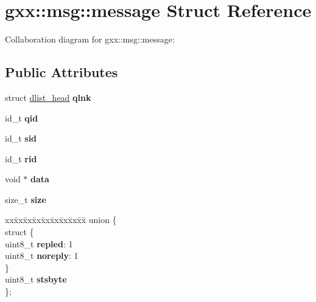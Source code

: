 \hypertarget{structgxx_1_1msg_1_1message}{}\section{gxx\+:\+:msg\+:\+:message Struct Reference}
\label{structgxx_1_1msg_1_1message}


Collaboration diagram for gxx\+:\+:msg\+:\+:message\+:
\subsection*{Public Attributes}
\begin{DoxyCompactItemize}
\item 
struct \hyperlink{structdlist__head}{dlist\+\_\+head} {\bfseries qlnk}\hypertarget{structgxx_1_1msg_1_1message_aab131dd5ad50013aaa9533d8c9e52fd8}{}\label{structgxx_1_1msg_1_1message_aab131dd5ad50013aaa9533d8c9e52fd8}

\item 
id\+\_\+t {\bfseries qid}\hypertarget{structgxx_1_1msg_1_1message_a4a767f9e00d74609cc0149b1c5ab6e15}{}\label{structgxx_1_1msg_1_1message_a4a767f9e00d74609cc0149b1c5ab6e15}

\item 
id\+\_\+t {\bfseries sid}\hypertarget{structgxx_1_1msg_1_1message_a891bfe1dd56d0a3872dc939ec88a7b7d}{}\label{structgxx_1_1msg_1_1message_a891bfe1dd56d0a3872dc939ec88a7b7d}

\item 
id\+\_\+t {\bfseries rid}\hypertarget{structgxx_1_1msg_1_1message_a9f7dbcaaa75550bae2e30be1e898c1f9}{}\label{structgxx_1_1msg_1_1message_a9f7dbcaaa75550bae2e30be1e898c1f9}

\item 
void $\ast$ {\bfseries data}\hypertarget{structgxx_1_1msg_1_1message_af2eb72051f369534ff48d9bee835a8e8}{}\label{structgxx_1_1msg_1_1message_af2eb72051f369534ff48d9bee835a8e8}

\item 
size\+\_\+t {\bfseries size}\hypertarget{structgxx_1_1msg_1_1message_acf47c6903027b747773fa52f0e8188af}{}\label{structgxx_1_1msg_1_1message_acf47c6903027b747773fa52f0e8188af}

\item 
\begin{tabbing}
xx\=xx\=xx\=xx\=xx\=xx\=xx\=xx\=xx\=\kill
union \{\\
\>struct \{\\
\>\>uint8\_t {\bfseries repled}: 1\\
\>\>uint8\_t {\bfseries noreply}: 1\\
\>\} \hypertarget{uniongxx_1_1msg_1_1message_1_1_0D13_a2571da021d03942614b8fe4a8037394d}{}\label{uniongxx_1_1msg_1_1message_1_1_0D13_a2571da021d03942614b8fe4a8037394d}
\\
\>uint8\_t {\bfseries stsbyte}\\
\}; \hypertarget{structgxx_1_1msg_1_1message_ad031d3d452188d157b982d442158d6f2}{}\label{structgxx_1_1msg_1_1message_ad031d3d452188d157b982d442158d6f2}
\\


\end{tabbing}
\end{DoxyCompactItemize}
